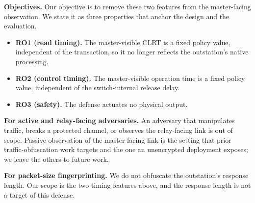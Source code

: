 \textbf{Objectives.} Our objective is to remove these two features from the master-facing observation.
We state it as three properties that anchor the design and the evaluation.
\begin{itemize}
  \item \textbf{RO1 (read timing).} The master-visible CLRT is a fixed policy value, independent of
    the transaction, so it no longer reflects the outstation's native processing.
  \item \textbf{RO2 (control timing).} The master-visible operation time is a fixed policy value,
    independent of the switch-internal release delay.
  \item \textbf{RO3 (safety).} The defense actuates no physical output.
\end{itemize}

\textbf{For active and relay-facing adversaries.} An adversary that manipulates traffic, breaks a
protected channel, or observes the relay-facing link is out of scope. Passive observation of the
master-facing link is the setting that prior traffic-obfuscation work targets and the one an
unencrypted deployment exposes; we leave the others to future work.

\textbf{For packet-size fingerprinting.} We do not obfuscate the outstation's response length. Our
scope is the two timing features above, and the response length is not a target of this defense.
